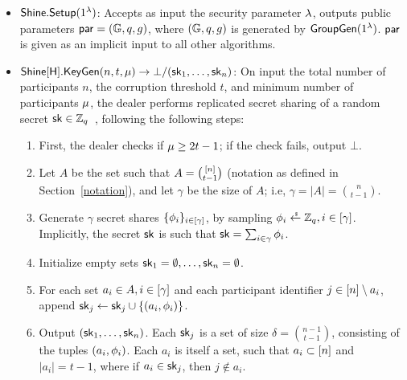 \begin{itemize}
  \item $\mathsf{Shine}.\mathsf{Setup}(1^{\lambda})$: Accepts as input the security parameter $\lambda$,
    outputs public parameters $\mathsf{par} = (\mathbb{G}, q, g)$,
    where $(\mathbb{G}, q, g)$ is generated by $\mathsf{GroupGen}(1^\lambda)$.
    $\mathsf{par}$ is given as an implicit input to all other algorithms.
  \item $\mathsf{Shine}[\mathsf{H}].\mathsf{KeyGen}(n, t, \mu) \rightarrow \bot/(\mathsf{sk}_1, \ldots, \mathsf{sk}_n)$:
    On input the total number of participants $n$,
    the corruption threshold $t$,
    and minimum number of participants $\mu$,
    the dealer performs replicated secret sharing of a random secret $\mathsf{sk} \in \mathbb{Z}_q$~\cite{CramerDI05},
    following the following steps:
    \begin{enumerate}
      \item First, the dealer checks if $\mu \geq 2t-1$;
        if the check fails, output $\bot$.
      \item Let $A$ be the set such that $A = {[n] \choose t-1}$ (notation as defined in Section~\ref{notation}),
        and let $\gamma$ be the size of $A$;
        i.e, $\gamma = \lvert A \rvert = {n \choose t-1}$.
      \item Generate $\gamma$ secret shares $\{\phi_i\}_{i \in [\gamma]}$,
        by sampling $\share_i \rgets \Zq, i \in \set{\gamma}$.
        Implicitly,
        the secret $\mathsf{sk}$ is such that $\mathsf{sk} = \sum_{i \in \gamma} \phi_i$.

      \item Initialize empty sets $\mathsf{sk}_1 = \emptyset, \ldots, \mathsf{sk}_n = \emptyset$.
      \item For each set $a_i \in A, i \in [\gamma]$
        and each participant identifier $j \in [n] \setminus a_i$,
        append $\mathsf{sk}_j \gets \mathsf{sk}_j \cup \{ (a_i, \phi_i) \}$.
      \item Output $(\mathsf{sk}_1, \ldots, \mathsf{sk}_n)$.
        Each $\mathsf{sk}_j$ is a set of size $\delta = {n-1 \choose t-1}$,
        consisting of the tuples $(a_i, \phi_i)$.
        Each $a_i$ is itself a set,
        such that $a_i \subset [n]$ and $\lvert a_i \rvert = t-1$,
        where if $a_i \in \mathsf{sk}_j$, then $j \not\in a_i$.
    \end{enumerate}


\end{itemize}

